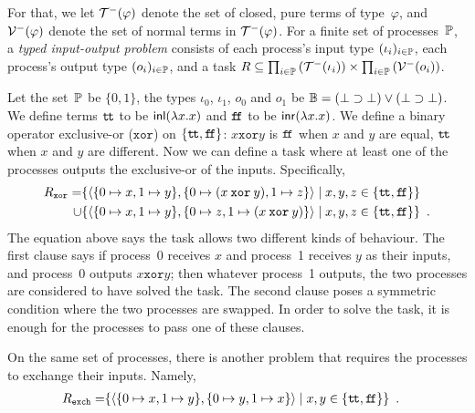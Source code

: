 For that, we let $\mathcal{T}^-(\varphi)$ denote the set of closed, pure terms of
type~$\varphi$,
and $\mathcal{V}^-(\varphi)$ denote the set of normal terms in $\mathcal{T}^-(\varphi)$.
For a finite set of processes~$\mathbb{P}$,
a \textit{typed input-output problem} consists
of each process's input type
$(\iota_i)_{i\in \mathbb{P}}$, each process's output type $(o_i)_{i\in
\mathbb{P}}$, and a
task $R\subseteq \prod_{i\in \mathbb{P}}\left(\mathcal{T}^-(\iota_i)\right)\times
 \prod_{i\in \mathbb{P}}\left(\mathcal{V}^-(o_i)\right)$.

\newcommand{\true}{\texttt{t\kern -1.2pt t}}
\newcommand{\false}{\texttt{f\kern -1.7pt f}}
\newcommand{\xor}{\mathbin{\mathtt{xor}}}
 \begin{example}
  \label{ex:xor}
  Let the set~$\mathbb{P}$ be $\{0,1\}$,
  the types $\iota_0$, $\iota_1$, $o_0$ and $o_1$ be
  $\mathbb{B} = (\bot\supset\bot)\lor(\bot\supset\bot)$.
  We define terms
  $\true$ to be $\mathsf{inl}({\lambda x.x})$ and
  $\false$ to be $\mathsf{inr}({\lambda x.x})$.
  We define a binary operator exclusive-or ($\mathtt{xor}$) on
  $\{\true,\false\}$:
  $x \xor y$ is $\false$ when $x$ and $y$ are equal, $\true$ when $x$
  and $y$ are different.
  Now we can define a task where at least one of the processes outputs
  the exclusive-or of the inputs.  Specifically,
  \begin{align*}
   R_{\mathtt{xor}} =&
   \{\tuple{\{0\mapsto x, 1\mapsto y\},\{0\mapsto (x\xor y), 1\mapsto z\}}\mid
   x,y,z\in\{\true,\false\}\}
   \\ \cup & \{\tuple{\{0\mapsto x, 1\mapsto y\},\{0\mapsto z, 1\mapsto
   (x \xor y)\}}\mid
   x,y,z\in\{\true,\false\}\}\enspace.
  \end{align*}
  The equation above says the task allows two different kinds of
  behaviour.  The first clause says if process~0 receives $x$ and
  process~1 receives $y$ as their inputs, and process~0 outputs $x\xor
  y$; then whatever process~1 outputs, the two processes are considered
  to have solved the task.  The second clause poses a symmetric
  condition where the two processes are swapped.
  In order to solve the task,
  it is enough for the processes to pass one of these clauses.
 \end{example}
  \begin{example}
   \label{ex:exchange}
   On the same set of processes, there is another problem that requires
   the processes to exchange their inputs.  Namely,
  \begin{align*}
   R_{\mathtt{exch}} =&
   \{\tuple{\{0\mapsto x, 1\mapsto y\},\{0\mapsto y, 1\mapsto x\}}\mid
   x,y\in\{\true,\false\}\}\enspace.
  \end{align*}
  \end{example}

